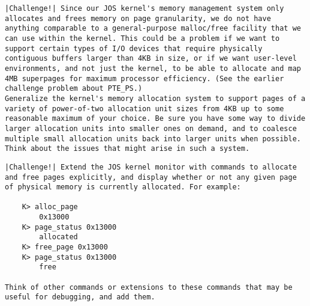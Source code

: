 \documentclass{article}
\begin{document}
\begin{CJK*}{UTF8}{gkai}
\begin{lstlisting}[style=challenge]
|Challenge!| Since our JOS kernel's memory management system only allocates and frees memory on page granularity, we do not have anything comparable to a general-purpose malloc/free facility that we can use within the kernel. This could be a problem if we want to support certain types of I/O devices that require physically contiguous buffers larger than 4KB in size, or if we want user-level environments, and not just the kernel, to be able to allocate and map 4MB superpages for maximum processor efficiency. (See the earlier challenge problem about PTE_PS.)
Generalize the kernel's memory allocation system to support pages of a variety of power-of-two allocation unit sizes from 4KB up to some reasonable maximum of your choice. Be sure you have some way to divide larger allocation units into smaller ones on demand, and to coalesce multiple small allocation units back into larger units when possible. Think about the issues that might arise in such a system.
\end{lstlisting}

\begin{lstlisting}[style=challenge]
|Challenge!| Extend the JOS kernel monitor with commands to allocate and free pages explicitly, and display whether or not any given page of physical memory is currently allocated. For example:

	K> alloc_page
		0x13000
	K> page_status 0x13000
		allocated
	K> free_page 0x13000
	K> page_status 0x13000
		free
	
Think of other commands or extensions to these commands that may be useful for debugging, and add them.
\end{lstlisting}


\begin{lstlisting}[style=console]
\end{lstlisting}

\begin{lstlisting}[style=console]
\end{lstlisting}

\begin{lstlisting}[style=console]
\end{lstlisting}

\begin{lstlisting}[style=console]
\end{lstlisting}


\clearpage

\end{CJK*}
\end{document}
